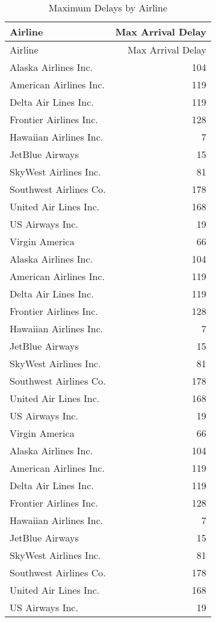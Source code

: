 \documentclass{article}
\begin{document}
\begin{longtable}[]{@{}lr@{}}
  \caption{\label{tab:maxdelays}Maximum Delays by Airline}\tabularnewline
  \toprule
  Airline & Max Arrival Delay \\
  \midrule
  \endfirsthead
  \toprule
  Airline & Max Arrival Delay \\
  \midrule
  \endhead
  Alaska Airlines Inc. & 104 \\
  American Airlines Inc. & 119 \\
  Delta Air Lines Inc. & 119 \\
  Frontier Airlines Inc. & 128 \\
  Hawaiian Airlines Inc. & 7 \\
  JetBlue Airways & 15 \\
  SkyWest Airlines Inc. & 81 \\
  Southwest Airlines Co. & 178 \\
  United Air Lines Inc. & 168 \\
  US Airways Inc. & 19 \\
  Virgin America & 66 \\
  Alaska Airlines Inc. & 104 \\
  American Airlines Inc. & 119 \\
  Delta Air Lines Inc. & 119 \\
  Frontier Airlines Inc. & 128 \\
  Hawaiian Airlines Inc. & 7 \\
  JetBlue Airways & 15 \\
  SkyWest Airlines Inc. & 81 \\
  Southwest Airlines Co. & 178 \\
  United Air Lines Inc. & 168 \\
  US Airways Inc. & 19 \\
  Virgin America & 66 \\
  Alaska Airlines Inc. & 104 \\
  American Airlines Inc. & 119 \\
  Delta Air Lines Inc. & 119 \\
  Frontier Airlines Inc. & 128 \\
  Hawaiian Airlines Inc. & 7 \\
  JetBlue Airways & 15 \\
  SkyWest Airlines Inc. & 81 \\
  Southwest Airlines Co. & 178 \\
  United Air Lines Inc. & 168 \\
  US Airways Inc. & 19 \\

\end{longtable}
\end{document}
